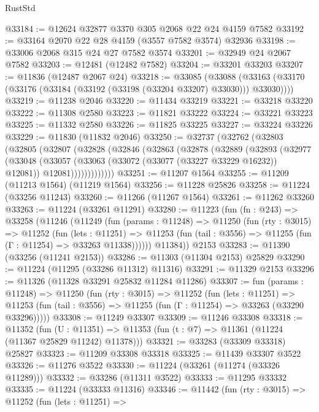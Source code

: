 \begin{lexlean}{RustStd}
\begin{coremodule}
@33184 := @12624 @32877 @3370 @305 @2068 @22 @24 @4159 @7582
@33192 := @33164 @2070 @22 @28 @4159 (@3557 @7582 @3574) @32936
@33198 := @33006 @2068 @315 @24 @27 @7582 @3574
@33201 := @32949 @24 @2067 @7582
@33203 := @12481 (@12482 @7582)
@33204 := @33201 @33203
@33207 := @11836 (@12487 @2067 @24)
@33218 := @33085
    (@33088 (@33163 (@33170 (@33176 (@33184 (@33192 (@33198 (@33204 @33207) @33030))) @33030))))
@33219 := @11238 @2046
@33220 := @11434 @33219
@33221 := @33218 @33220
@33222 := @11308 @2580
@33223 := @11821 @33222
@33224 := @33221 @33223
@33225 := @11332 @2580
@33226 := @11825 @33225
@33227 := @33224 @33226
@33229 := @11830 (@11832 @2046)
@33250 := @32737
    (@32762
      (@32803
        (@32805
          (@32807
            (@32828
              (@32846
                (@32863
                  (@32878
                    (@32889
                      (@32893
                        (@32977
                          (@33048
                            (@33057
                              (@33063 (@33072 (@33077 (@33227 @33229 @16232)) @12081))
                              @12081)))))))))))))
@33251 := @11207 @1564
@33255 := @11209 (@11213 @1564) (@11219 @1564)
@33256 := @11228 @25826
@33258 := @11224 (@33256 @11243)
@33260 := @11266 (@11267 @1564)
@33261 := @11262 @33260
@33263 := @11224 (@33261 @11291)
@33280 := @11223
    (fun (fn : @243) =>
    @33258
      (@11246
        (@11249
          (fun (params : @11248) =>
          @11250
            (fun (rty : @3015) =>
            @11252
              (fun (lets : @11251) =>
              @11253 (fun (tail : @3556) => @11255 (fun (Γ : @11254) => @33263 @11338))))))
        @11384))
    @2153
@33283 := @11390 (@33256 (@11241 @2153))
@33286 := @11303 (@11304 @2153) @25829
@33290 := @11224 (@11295 (@33286 @11312) @11316)
@33291 := @11329 @2153
@33296 := @11326 (@11328 @33291 @25832 @11284 @11286)
@33307 := fun (params : @11248) =>
  @11250
    (fun (rty : @3015) =>
    @11252
      (fun (lets : @11251) =>
      @11253 (fun (tail : @3556) => @11255 (fun (Γ : @11254) => @33263 (@33290 @33296)))))
@33308 := @11249 @33307
@33309 := @11246 @33308
@33318 := @11352
    (fun (U : @11351) => @11353 (fun (t : @7) => @11361 (@11224 (@11367 @25829 @11242) @11378)))
@33321 := @33283 (@33309 @33318) @25827
@33323 := @11209 @33308 @33318
@33325 := @11439 @33307 @3522
@33326 := @11276 @3522
@33330 := @11224 (@33261 (@11274 (@33326 @11289)))
@33332 := @33286 (@11311 @3522)
@33333 := @11295 @33332
@33335 := @11224 (@33333 @11316)
@33346 := @11442
    (fun (rty : @3015) =>
    @11252
      (fun (lets : @11251) =>

\end{coremodule}
\end{lexlean}

